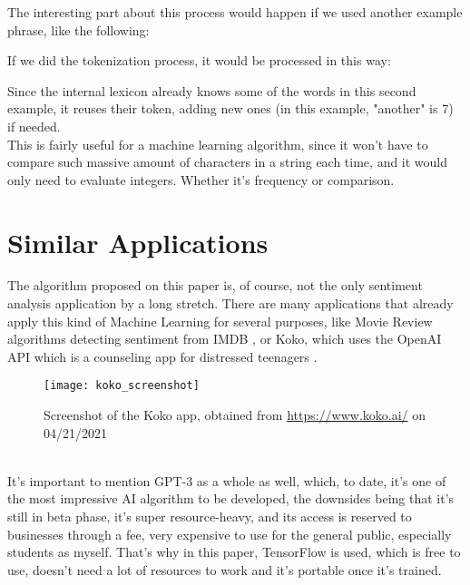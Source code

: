 The interesting part about this process would happen if we used another example phrase, like the following:
\begin{center}
\end{center}

If we did the tokenization process, it would be processed in this way:
\begin{center}
\end{center}

Since the internal lexicon already knows some of the words in this second example, it reuses their token, adding new ones (in this example, "another" is 7) if needed.\\

This is fairly useful for a machine learning algorithm, since it won't have to compare such massive amount of characters in a string each time, and it would only need to evaluate integers. Whether it's frequency or comparison.

\section{Similar Applications}
The algorithm proposed on this paper is, of course, not the only sentiment analysis application by a long stretch. There are many applications that already apply this kind of Machine Learning for several purposes, like Movie Review algorithms detecting sentiment from IMDB \citep{rf5}, or Koko, which uses the OpenAI API which is a counseling app for distressed teenagers \citep{rf6}.
\begin{figure}[h]
	\centering
	\texttt{[image: koko\_screenshot]}
	\caption{Screenshot of the Koko app, obtained from \url{https://www.koko.ai/} on 04/21/2021}
	\label{fig:koko}
\end{figure}
\\
It's important to mention GPT-3 as a whole as well, which, to date, it's one of the most impressive AI algorithm to be developed, the downsides being that it's still in beta phase, it's super resource-heavy, and its access is reserved to businesses through a fee, very expensive to use for the general public, especially students as myself. That's why in this paper, TensorFlow is used, which is free to use, doesn't need a lot of resources to work and it's portable once it's trained.

\clearpage